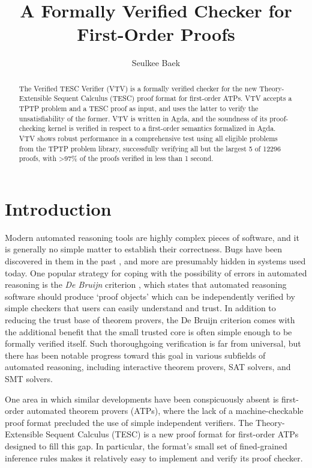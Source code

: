 \documentclass[12pt]{article}
\title{A Formally Verified Checker for\\ First-Order Proofs}
\author{Seulkee Baek}
\date{}
\affil{Department of Philosophy, Carnegie Mellon University}
\affil{\textit{seulkeeb@andrew.cmu.edu}}
\begin{document}
\maketitle

\begin{abstract}

The Verified TESC Verifier (VTV) is a formally verified checker for the new 
Theory-Extensible Sequent Calculus (TESC) proof format for first-order ATPs. 
VTV accepts a TPTP problem and a TESC proof as input, and uses the latter to 
verify the unsatisfiability of the former. VTV is written in Agda, and the 
soundness of its proof-checking kernel is verified in respect to a first-order
semantics formalized in Agda. VTV shows robust performance in a comprehensive 
test using all eligible problems from the TPTP problem library, successfully 
verifying all but the largest 5 of 12296 proofs, with >97\% of the 
proofs verified in less than 1 second. 

\end{abstract}

\section{Introduction}

Modern automated reasoning tools are highly complex pieces of software, 
and it is generally no simple matter to establish their correctness.
Bugs have been discovered in them in the past \cite{reger2017testing,harrison2006towards}, 
and more are presumably hidden in systems used today. 
One popular strategy for coping with the possibility of errors 
in automated reasoning is the \textit{De Bruijn} criterion \cite{barendregt2005challenge}, 
which states that automated reasoning software should produce `proof objects' which can be 
independently verified by simple checkers that users can easily understand 
and trust. In addition to reducing the trust base of theorem provers, 
the De Bruijn criterion comes with the additional benefit that the 
small trusted core is often simple enough to be formally verified itself. 
Such thoroughgoing verification is far from universal, but there has been notable 
progress toward this goal in various subfields of automated reasoning, including 
interactive theorem provers, SAT solvers, and SMT solvers.

One area in which similar developments have been conspicuously absent is 
first-order automated theorem provers (ATPs), where the lack of a machine-checkable
proof format \cite{reger2017checkable} precluded the use of simple independent verifiers. 
The Theory-Extensible Sequent Calculus (TESC) is a new 
proof format for first-order ATPs designed to fill this gap. In particular,
the format's small set of fined-grained inference rules makes it relatively 
easy to implement and verify its proof checker.
\end{document}
